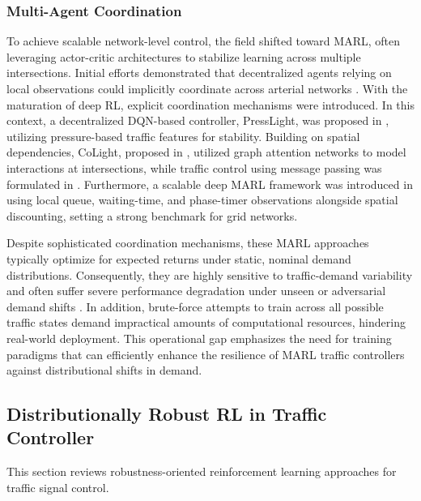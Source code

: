 \documentclass[lettersize,journal]{IEEEtran}
\begin{document}
\subsubsection{Multi-Agent Coordination}
To achieve scalable network-level control, the field shifted toward MARL, often leveraging actor-critic architectures to stabilize learning across multiple intersections. Initial efforts demonstrated that decentralized agents relying on local observations could implicitly coordinate across arterial networks \cite{van2016coordinated}. With the maturation of deep RL, explicit coordination mechanisms were introduced. In this context,  a decentralized DQN-based controller, PressLight, was proposed in \cite{wei2019presslight}, utilizing pressure-based traffic features for stability. Building on spatial dependencies, CoLight, proposed in \cite{wei2019colight}, utilized graph attention networks to model interactions at intersections, while traffic control using message passing was formulated in \cite{zhang2023learning}. Furthermore, a scalable deep MARL framework was introduced in \cite{chu2019multi} using local queue, waiting-time, and phase-timer observations alongside spatial discounting, setting a strong benchmark for grid networks.

Despite sophisticated coordination mechanisms, these MARL approaches typically optimize for expected returns under static, nominal demand distributions. Consequently, they are highly sensitive to traffic-demand variability and often suffer severe performance degradation under unseen or adversarial demand shifts \cite{9294623, huang2026robustefficientmultiagentreinforcement}. In addition, brute-force attempts to train across all possible traffic states demand impractical amounts of computational resources, hindering real-world deployment. This operational gap emphasizes the need for training paradigms that can efficiently enhance the resilience of MARL traffic controllers against distributional shifts in demand.
\subsection{Distributionally Robust RL in Traffic Controller}
\label{subsec:robust_marl_tsc}
This section reviews robustness-oriented reinforcement learning approaches for traffic signal control.
\end{document}
